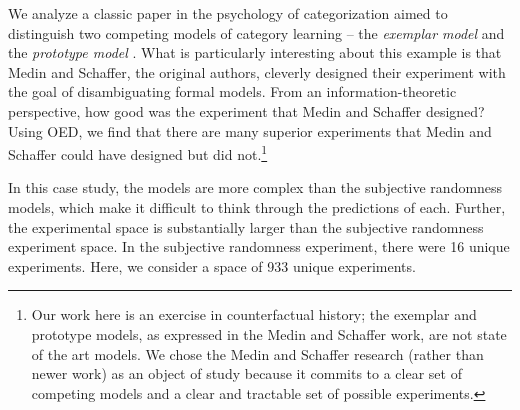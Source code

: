 \documentclass{article}
\newcommand{\lou}[1]{\textcolor{orange}{[lou: #1]}}
\begin{document}
We analyze a classic paper in the psychology of categorization aimed to distinguish two competing models of category learning -- the \emph{exemplar model} and the \emph{prototype model} \cite{medin78:pr}. What is particularly interesting about this example is that Medin and Schaffer, the original authors, cleverly designed their experiment with the goal of disambiguating formal models.
From an information-theoretic perspective, how good was the experiment that Medin and Schaffer designed?
Using OED, we find that there are many superior experiments that Medin and Schaffer could have designed but did not.\footnote{Our work here is an exercise in counterfactual history; the exemplar and prototype models, as expressed in the Medin and Schaffer work, are not state of the art models. We chose the Medin and Schaffer research (rather than newer work) as an object of study because it commits to a clear set of competing models and a clear and tractable set of possible experiments.}

In this case study, the models are more complex than the subjective randomness models, which make it difficult to think through the predictions of each.
Further, the experimental space is substantially larger than the subjective randomness experiment space. In the subjective randomness experiment, there were 16 unique experiments. Here, we consider a space of 933 unique experiments.


%
%
%
%



\end{document}
